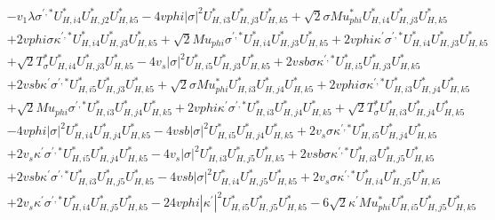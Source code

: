 \begin{align}
 &- v_1 \lambda \sigma^{\prime,*} U^*_{{H},{i 4}} U^*_{{H},{j 2}} U^*_{{H},{k 5}} -4 vphi |\sigma|^2 U^*_{{H},{i 3}} U^*_{{H},{j 3}} U^*_{{H},{k 5}} +\sqrt{2} \sigma Mu_{phi}^* U^*_{{H},{i 4}} U^*_{{H},{j 3}} U^*_{{H},{k 5}} \nonumber \\ 
 &+2 vphi \sigma \kappa^{\prime,*} U^*_{{H},{i 4}} U^*_{{H},{j 3}} U^*_{{H},{k 5}} +\sqrt{2} Mu_{phi} \sigma^{\prime,*} U^*_{{H},{i 4}} U^*_{{H},{j 3}} U^*_{{H},{k 5}} +2 vphi \kappa^\prime \sigma^{\prime,*} U^*_{{H},{i 4}} U^*_{{H},{j 3}} U^*_{{H},{k 5}} \nonumber \\ 
 &+\sqrt{2} T_{\sigma}^* U^*_{{H},{i 4}} U^*_{{H},{j 3}} U^*_{{H},{k 5}} -4 v_s |\sigma|^2 U^*_{{H},{i 5}} U^*_{{H},{j 3}} U^*_{{H},{k 5}} +2 vsb \sigma \kappa^{\prime,*} U^*_{{H},{i 5}} U^*_{{H},{j 3}} U^*_{{H},{k 5}} \nonumber \\ 
 &+2 vsb \kappa^\prime \sigma^{\prime,*} U^*_{{H},{i 5}} U^*_{{H},{j 3}} U^*_{{H},{k 5}} +\sqrt{2} \sigma Mu_{phi}^* U^*_{{H},{i 3}} U^*_{{H},{j 4}} U^*_{{H},{k 5}} +2 vphi \sigma \kappa^{\prime,*} U^*_{{H},{i 3}} U^*_{{H},{j 4}} U^*_{{H},{k 5}} \nonumber \\ 
 &+\sqrt{2} Mu_{phi} \sigma^{\prime,*} U^*_{{H},{i 3}} U^*_{{H},{j 4}} U^*_{{H},{k 5}} +2 vphi \kappa^\prime \sigma^{\prime,*} U^*_{{H},{i 3}} U^*_{{H},{j 4}} U^*_{{H},{k 5}} +\sqrt{2} T_{\sigma}^* U^*_{{H},{i 3}} U^*_{{H},{j 4}} U^*_{{H},{k 5}} \nonumber \\ 
 &-4 vphi |\sigma|^2 U^*_{{H},{i 4}} U^*_{{H},{j 4}} U^*_{{H},{k 5}} -4 vsb |\sigma|^2 U^*_{{H},{i 5}} U^*_{{H},{j 4}} U^*_{{H},{k 5}} +2 v_s \sigma \kappa^{\prime,*} U^*_{{H},{i 5}} U^*_{{H},{j 4}} U^*_{{H},{k 5}} \nonumber \\ 
 &+2 v_s \kappa^\prime \sigma^{\prime,*} U^*_{{H},{i 5}} U^*_{{H},{j 4}} U^*_{{H},{k 5}} -4 v_s |\sigma|^2 U^*_{{H},{i 3}} U^*_{{H},{j 5}} U^*_{{H},{k 5}} +2 vsb \sigma \kappa^{\prime,*} U^*_{{H},{i 3}} U^*_{{H},{j 5}} U^*_{{H},{k 5}} \nonumber \\ 
 &+2 vsb \kappa^\prime \sigma^{\prime,*} U^*_{{H},{i 3}} U^*_{{H},{j 5}} U^*_{{H},{k 5}} -4 vsb |\sigma|^2 U^*_{{H},{i 4}} U^*_{{H},{j 5}} U^*_{{H},{k 5}} +2 v_s \sigma \kappa^{\prime,*} U^*_{{H},{i 4}} U^*_{{H},{j 5}} U^*_{{H},{k 5}} \nonumber \\ 
 &+2 v_s \kappa^\prime \sigma^{\prime,*} U^*_{{H},{i 4}} U^*_{{H},{j 5}} U^*_{{H},{k 5}} -24 vphi |\kappa^\prime|^2 U^*_{{H},{i 5}} U^*_{{H},{j 5}} U^*_{{H},{k 5}} -6 \sqrt{2} \kappa^\prime Mu_{phi}^* U^*_{{H},{i 5}} U^*_{{H},{j 5}} U^*_{{H},{k 5}} \nonumber \\ 

\end{align}
